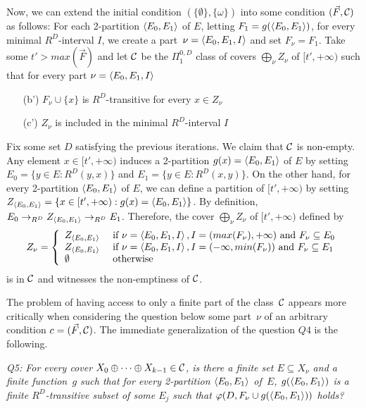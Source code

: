 Now, we can extend the initial condition $(\{\emptyset\}, \{\omega\})$
into some condition $(\vec{F}, \mathcal{C})$ as follows:
For each 2-partition $\left\langle E_0, E_1 \right\rangle$ of $E$, letting $F_1 = g(\left\langle E_0, E_1 \right\rangle)$, 
for every minimal $R^D$-interval $I$, we create a part~$\nu = \left\langle E_0, E_1, I \right\rangle$
and set $F_\nu = F_1$. Take some $t' > max(\vec{F})$
and let $\mathcal{C}$ be the $\Pi^{0,D}_1$ class of covers $\bigoplus_\nu Z_\nu$ of $[t', +\infty)$ such that
for every part $\nu = \left\langle E_0, E_1, I \right\rangle$
\begin{itemize}
	\item[(b')] $F_\nu \cup \{x\}$ is $R^D$-transitive for every $x \in Z_\nu$
	\item[(c')] $Z_\nu$ is included in the minimal $R^D$-interval $I$
\end{itemize}
Fix some set $D$ satisfying the previous iterations. We claim that $\mathcal{C}$ is non-empty.
Any element $x \in [t', +\infty)$ induces a 2-partition $g(x) = \left\langle E_0, E_1 \right\rangle$ of $E$ by
setting $E_0 = \{ y \in E : R^D(y, x) \}$ and $E_1 = \{y \in E : R^D(x, y)\}$.
On the other hand, for every 2-partition $\left\langle E_0, E_1 \right\rangle$ of $E$,
we can define a partition of $[t', +\infty)$ by setting
$Z_{\left\langle E_0, E_1 \right\rangle} = \{ x \in [t',+\infty) : g(x) = \left\langle E_0, E_1 \right\rangle \}$.
By definition, $E_0 \to_{R^D} Z_{\left\langle E_0, E_1 \right\rangle}  \to_{R^D} E_1$.
Therefore, the cover $\bigoplus_\nu Z_\nu$ of $[t', +\infty)$ defined by
\[
Z_\nu = \left\{\begin{array}{ll} 
	Z_{\left\langle E_0, E_1 \right\rangle} & \mbox{ if } \nu = \left\langle E_0, E_1, I \right\rangle, I = (max(F_\nu), +\infty) \mbox{ and } F_\nu \subseteq E_0\\
	Z_{\left\langle E_0, E_1 \right\rangle} & \mbox{ if } \nu = \left\langle E_0, E_1, I \right\rangle, I = (-\infty, min(F_\nu)) \mbox{ and } F_\nu \subseteq E_1\\
	\emptyset & \mbox{ otherwise}\\
 \end{array}\right.
\]
is in $\mathcal{C}$ and witnesses the non-emptiness of $\mathcal{C}$.

The problem of having access to only a finite part of the class~$\mathcal{C}$ appears
more critically when considering the question below some part~$\nu$ of an arbitrary condition $c = (\vec{F}, \mathcal{C})$.
The immediate generalization of the question $Q4$ is the following.

\smallskip
{\itshape
Q5: For every cover $X_0 \oplus \dots \oplus X_{k-1} \in \mathcal{C}$, is there a finite set $E \subseteq X_\nu$ and a finite function~$g$ such that for every 2-partition $\left\langle E_0, E_1 \right\rangle$ of~$E$,
$g(\left\langle E_0, E_1 \right\rangle)$ is a finite $R^D$-transitive subset of some $E_j$ such that $\varphi(D, F_\nu \cup g(\left\langle E_0, E_1 \right\rangle))$ holds?
}
\smallskip

